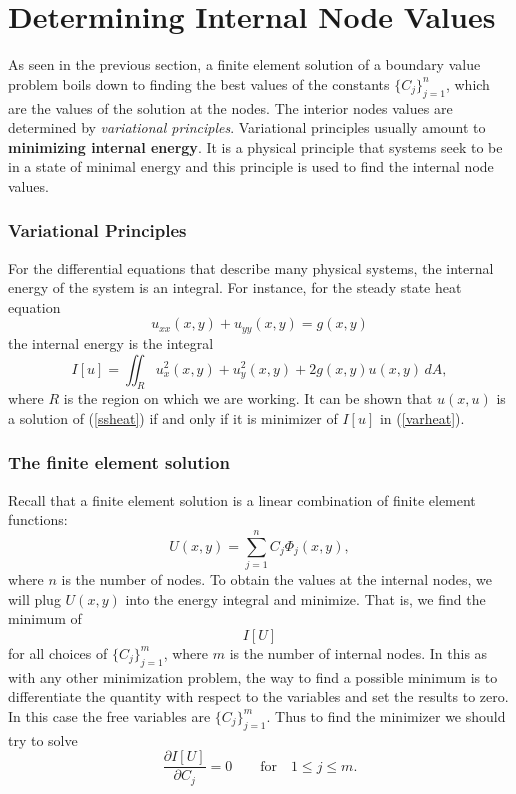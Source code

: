 
\chapter{Determining Internal Node Values}

As seen in the previous section, a finite element solution of a
boundary value problem boils down to finding the best values of the
constants $\{C_j\}_{j=1}^n$, which are the values of the solution at
the nodes. The interior nodes values are determined by {\em
variational principles}. Variational principles usually amount to {\bf
minimizing internal energy}. It is a physical principle that systems
seek to be in a state of minimal energy and this principle is used to
find the internal node values.


\subsection*{Variational Principles}

For the differential equations that describe many physical systems, the
internal energy of the system is an integral. For instance, for the steady
state heat equation
\begin{equation}\label{ssheat}
      u_{xx}(x,y) + u_{yy}(x,y) = g(x,y)
\end{equation}
the internal energy is the integral
\begin{equation}\label{varheat}
     I[u] =  \iint_R u_x^2(x,y) + u_y^2(x,y) + 2g(x,y) u(x,y) \,dA,
\end{equation}
where $R$ is the region on which we are working.
It can be shown that $u(x,u)$ is a solution of (\ref{ssheat}) if and only if
it is minimizer of $I[u]$ in (\ref{varheat}).


\subsection*{The finite element solution}

Recall that a finite element solution is a linear combination of
finite element functions:
$$
U(x,y) = \sum_{j=1}^n C_j \Phi_j(x,y),
$$
where  $n$ is the number of nodes. To obtain the values at the
internal nodes, we will plug $U(x,y)$ into the energy integral and
minimize. That is, we find the minimum of
$$
    I[U]
$$
for all choices of $\{C_j\}_{j=1}^m$, where $m$ is the number of internal
nodes. In this as with any other minimization problem, the way to
find a possible minimum is to differentiate the quantity with respect to
the variables and set the results to zero. In this case the free variables are
$\{C_j\}_{j=1}^m$. Thus to find the minimizer we should try to solve
\begin{equation}\label{IC}
      \frac{\partial I[U]}{\partial C_j} = 0 \qquad \textrm{for} \quad 1 \le j \le m.
\end{equation}

